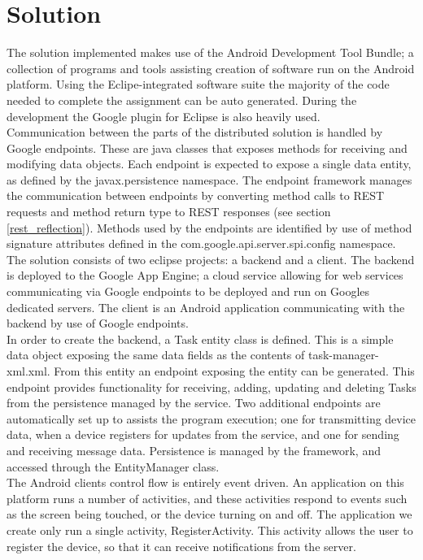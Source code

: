 \section{Solution}
The solution implemented makes use of the Android Development Tool Bundle; a collection of programs and tools assisting creation of software run on the Android platform. Using the Eclipe-integrated software suite the majority of the code needed to complete the assignment can be auto generated. During the development the Google plugin for Eclipse is also heavily used.\\
Communication between the parts of the distributed solution is handled by Google endpoints. These are java classes that exposes methods for receiving and modifying data objects. Each endpoint is expected to expose a single data entity, as defined by the javax.persistence namespace. The endpoint framework manages the communication between endpoints by converting method calls to REST requests and method return type to REST responses (see section \ref{rest_reflection}). Methods used by the endpoints are identified by use of method signature attributes defined in the com.google.api.server.spi.config namespace.\\
The solution consists of two eclipse projects: a backend and a client. The backend is deployed to the Google App Engine; a cloud service allowing for web services communicating via Google endpoints to be deployed and run on Googles dedicated servers. The client is an Android application communicating with the backend by use of Google endpoints.\\
In order to create the backend, a Task entity class is defined. This is a simple data object exposing the same data fields as the contents of task-manager-xml.xml. From this entity an endpoint exposing the entity can be generated. This endpoint provides functionality for receiving, adding, updating and deleting Tasks from the persistence managed by the service. Two additional endpoints are automatically set up to assists the program execution; one for transmitting device data, when a device registers for updates from the service, and one for sending and receiving message data. Persistence is managed by the framework, and accessed through the EntityManager class.\\
The Android clients control flow is entirely event driven. An application on this platform runs a number of activities, and these activities respond to events such as the screen being touched, or the device turning on and off. The application we create only run a single activity, RegisterActivity. This activity allows the user to register the device, so that it can receive notifications from the server. \\
